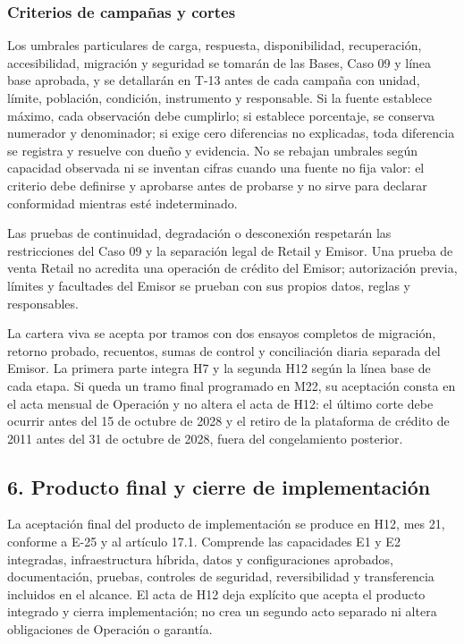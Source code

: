 \documentclass[11pt]{article}
\begin{document}
\subsubsection{Criterios de campañas y cortes}\label{t17-criterios-de-campauxf1as-y-cortes}

Los umbrales particulares de carga, respuesta, disponibilidad, recuperación, accesibilidad, migración y seguridad se tomarán de las Bases, Caso 09 y línea base aprobada, y se detallarán en T-13 antes de cada campaña con unidad, límite, población, condición, instrumento y responsable. Si la fuente establece máximo, cada observación debe cumplirlo; si establece porcentaje, se conserva numerador y denominador; si exige cero diferencias no explicadas, toda diferencia se registra y resuelve con dueño y evidencia. No se rebajan umbrales según capacidad observada ni se inventan cifras cuando una fuente no fija valor: el criterio debe definirse y aprobarse antes de probarse y no sirve para declarar conformidad mientras esté indeterminado.

Las pruebas de continuidad, degradación o desconexión respetarán las restricciones del Caso 09 y la separación legal de Retail y Emisor. Una prueba de venta Retail no acredita una operación de crédito del Emisor; autorización previa, límites y facultades del Emisor se prueban con sus propios datos, reglas y responsables.

La cartera viva se acepta por tramos con dos ensayos completos de migración, retorno probado, recuentos, sumas de control y conciliación diaria separada del Emisor. La primera parte integra H7 y la segunda H12 según la línea base de cada etapa. Si queda un tramo final programado en M22, su aceptación consta en el acta mensual de Operación y no altera el acta de H12: el último corte debe ocurrir antes del 15 de octubre de 2028 y el retiro de la plataforma de crédito de 2011 antes del 31 de octubre de 2028, fuera del congelamiento posterior.

\subsection{6. Producto final y cierre de implementación}\label{t17-producto-final-y-cierre-de-implementaciuxf3n}

La aceptación final del producto de implementación se produce en H12, mes 21, conforme a E-25 y al artículo 17.1. Comprende las capacidades E1 y E2 integradas, infraestructura híbrida, datos y configuraciones aprobados, documentación, pruebas, controles de seguridad, reversibilidad y transferencia incluidos en el alcance. El acta de H12 deja explícito que acepta el producto integrado y cierra implementación; no crea un segundo acto separado ni altera obligaciones de Operación o garantía.
\end{document}
